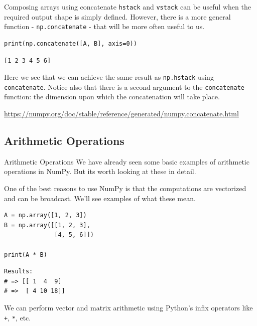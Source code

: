 \documentclass[10pt]{beamer}
\begin{document}
\begin{frame}[label={sec:org5012433},fragile]{Composing arrays using concatenate}
 \texttt{hstack} and \texttt{vstack} can be useful when the required output shape is simply
defined. However, there is a more general function - \texttt{np.concatenate} - that will be
more often useful to us.

\begin{verbatim}
print(np.concatenate([A, B], axis=0))
\end{verbatim}

\begin{verbatim}
[1 2 3 4 5 6]
\end{verbatim}


Here we see that we can achieve the same result as \texttt{np.hstack} using
\texttt{concatenate}. Notice also that there is a second argument to the \texttt{concatenate} function:
the dimension upon which the concatenation will take place.

\url{https://numpy.org/doc/stable/reference/generated/numpy.concatenate.html}
\end{frame}

\subsection{Arithmetic Operations}
\label{sec:org5a472ab}

\begin{frame}[label={sec:org2e8e6b9},fragile]{Arithmetic Operations}
 We have already seen some basic examples of arithmetic operations in NumPy. But its
worth looking at these in detail.

One of the best reasons to use NumPy is that the computations are \alert{vectorized} and can
be \alert{broadcast}. We'll see examples of what these mean.

\begin{verbatim}
A = np.array([1, 2, 3])
B = np.array([[1, 2, 3],
              [4, 5, 6]])

print(A * B)
\end{verbatim}

\begin{verbatim}
Results: 
# => [[ 1  4  9]
# =>  [ 4 10 18]]
\end{verbatim}


We can perform vector and matrix arithmetic using Python's infix operators like \texttt{+}, \texttt{*},
etc.
\end{frame}
\end{document}
